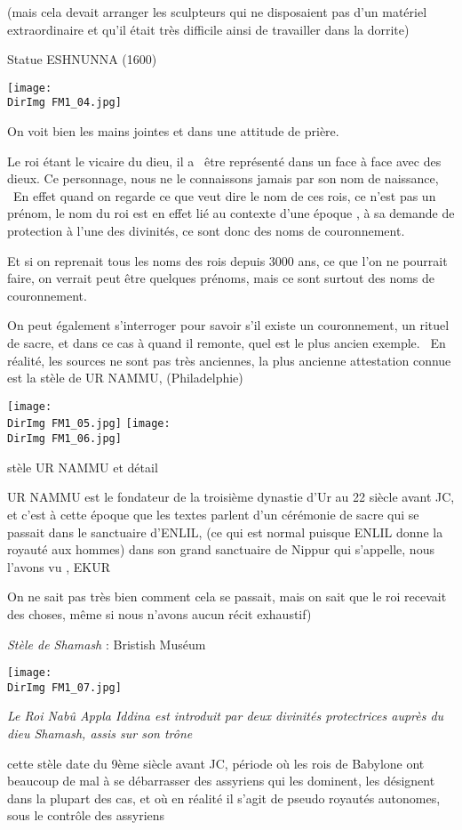 \documentclass[a4paper]{article}
\newcommand{\DirImg}{../img/FaivreMartin/}
\begin{document}
(mais cela devait arranger les sculpteurs qui ne disposaient pas d'un matériel extraordinaire et qu'il était très
difficile ainsi de travailler dans la dorrite)


Statue ESHNUNNA (1600)


\texttt{[image: \\DirImg FM1\_04.jpg]} 


On voit bien les mains jointes et dans une attitude de prière.


Le roi étant le vicaire du dieu, il a \ être représenté dans un face à face avec des dieux. Ce personnage, nous ne le
connaissons jamais par son nom de naissance, \ En effet quand on regarde ce que veut dire le nom de ces rois, ce n'est
pas un prénom, le nom du roi est en effet lié au contexte d'une époque , à sa demande de protection à l'une des
divinités, ce sont donc des noms de couronnement.

Et si on reprenait tous les noms des rois depuis 3000 ans, ce que l'on ne pourrait faire, on verrait peut être quelques
prénoms, mais ce sont surtout des noms de couronnement.


On peut également s'interroger pour savoir s'il existe un couronnement, un rituel de sacre, et dans ce cas à quand il
remonte, quel est le plus ancien exemple. \ En réalité, les sources ne sont pas très anciennes, la plus ancienne
attestation connue est la stèle de UR NAMMU, (Philadelphie)


\texttt{[image: \\DirImg FM1\_05.jpg]} 
\texttt{[image: \\DirImg FM1\_06.jpg]} 


stèle UR NAMMU et détail


UR NAMMU est le fondateur de la troisième dynastie d'Ur au 22 siècle avant JC, et c'est à cette époque que les textes
parlent d'un cérémonie de sacre qui se passait dans le sanctuaire d'ENLIL, (ce qui est normal puisque ENLIL donne la
royauté aux hommes) dans son grand sanctuaire de Nippur qui s'appelle, nous l'avons vu , EKUR

On ne sait pas très bien comment cela se passait, mais on sait que le roi recevait des choses, même si nous n'avons
aucun récit exhaustif)


\textit{Stèle de Shamash} : Bristish Muséum


\texttt{[image: \\DirImg FM1\_07.jpg]} 


\textit{Le Roi Nabû Appla Iddina est introduit par deux divinités protectrices auprès du dieu Shamash, assis sur son
trône}


cette stèle date du 9ème siècle avant JC, période où les rois de Babylone ont beaucoup de mal à se débarrasser des
assyriens qui les dominent, les désignent dans la plupart des cas, et où en réalité il s'agit de pseudo royautés
autonomes, sous le contrôle des assyriens
\end{document}
